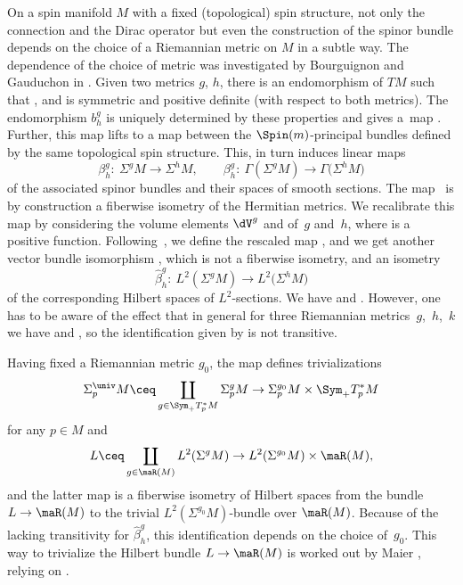 On a spin manifold $M$ with a fixed (topological) spin structure,
not only the connection and the Dirac operator but even the construction of the spinor bundle
depends on the choice of a Riemannian metric on $M$ in a subtle way. The dependence of the choice of metric was investigated by Bourguignon and Gauduchon in \cite{bourguignon.gauduchon:92}.
Given two metrics $g$, $h$, there is an endomorphism  of $TM$
such that , and  is symmetric
and positive definite (with respect to both metrics).
The endomorphism $b^g_h$ is uniquely determined by these properties and
gives a~map .
Further, this map lifts to a map  between the $\Spin(m)$-principal bundles defined by the same topological spin structure.
This, in turn induces linear maps
\[
\beta^g_h\colon\ \Sigma^g M\to \Sigma^h M, \qquad
\beta^g_h\colon\ \Gamma(\Sigma^g M) \to \Gamma\bigl(\Sigma^h M\bigr)
\]
of the associated spinor bundles and their spaces of smooth sections.
The map~ is by construction a fiberwise isometry of the Hermitian metrics. We recalibrate this map by considering the volume elements $\dV^{g}$ and  of~$g$ and~$h$, where  is a positive function.
Following~\cite{maier:97}, we define the rescaled map ,
and we get another vector bundle isomorphism , which is not a fiberwise isometry, and an isometry
\[
\hat\beta^g_h\colon\ L^2(\Sigma^g M) \to L^2\bigl(\Sigma^h M\bigr)
\]
of the corresponding Hilbert spaces of $L^2$-sections. We have  and .
However, one has to be aware of the effect that in general for three Riemannian metrics~$g$,~$h$,~$k$ we have  and , so the identification given by  is not transitive.

Having fixed a Riemannian metric $g_0$, the map  defines trivializations
\[
\Sigma^{\univ}_p M\ceq \coprod_{g\in \Sym_+T^*_pM }\Sigma^g_p M\to \Sigma^{g_0}_p M\times \Sym_+T^*_pM
\]
for any $p\in M$ and
\[
L\ceq \coprod_{g\in \maR(M)}L^2(\Sigma^g M)\to L^2(\Sigma^{g_0}M)\times \maR(M),
\]
and the latter map is a fiberwise isometry of Hilbert spaces from the bundle $L\to \maR(M)$ to the trivial $L^2(\Sigma^{g_0}M)$-bundle over $\maR(M)$.
Because of the lacking transitivity for $\hat\beta^g_h$, this identification depends on the choice of~$g_0$. This way to trivialize the Hilbert bundle $L\to \maR(M)$ is worked out by Maier \cite{maier:97}, relying on \cite{bourguignon.gauduchon:92}.

